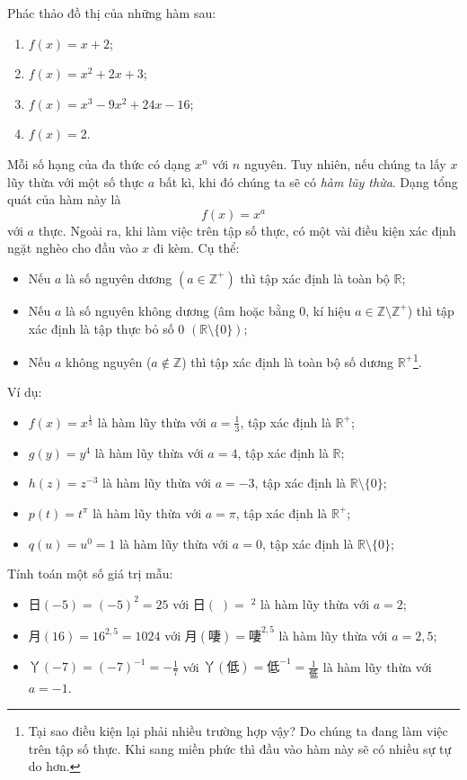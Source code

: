 \documentclass[a4paper, titlepage, openany]{book}
\newcounter{exercise}
\newcounter{solution}
\begin{document}
\exercise Phác thảo đồ thị của những hàm sau:
\begin{multicols}{2}
\begin{enumerate}
   \item $f(x) = x + 2$; 
   \item $f(x) = x^2 + 2x + 3$;
   \item $f(x) = x^3 - 9x^2 + 24x - 16$;
   \item $f(x) = 2$.
\end{enumerate}
\end{multicols}

\solution

Mỗi số hạng của đa thức có dạng $x^n$ với $n$ nguyên. Tuy nhiên, nếu chúng ta lấy $x$ lũy thừa với một số thực $a$ bất kì, khi đó chúng ta sẽ có \emph{hàm lũy thừa}. Dạng tổng quát của hàm này là $$f(x) = x^a$$ với $a$ thực. Ngoài ra, khi làm việc trên tập số thực, có một vài điều kiện xác định ngặt nghèo cho đầu vào $x$ đi kèm. Cụ thể:
\begin{itemize}
   \item Nếu $a$ là số nguyên dương $\left(a \in \mathbb{Z}^+\right)$ thì tập xác định là toàn bộ $\mathbb{R}$;
   \item Nếu $a$ là số nguyên không dương (âm hoặc bằng $0$, kí hiệu $a \in \mathbb{Z} \setminus\mathbb{Z}^+$) thì tập xác định là tập thực bỏ số $0$ $\left(\mathbb{R} \setminus \{0\}\right)$;
   \item Nếu $a$ không nguyên ($a \notin \mathbb{Z}$) thì tập xác định là toàn bộ số dương $\mathbb{R}^+$\footnote{Tại sao điều kiện lại phải nhiều trường hợp vậy? Do chúng ta đang làm việc trên tập số thực. Khi sang miền phức thì đầu vào hàm này sẽ có nhiều sự tự do hơn.}.
\end{itemize}
Ví dụ:
\begin{itemize}
   \item $f(x) = x^{\frac{1}{3}}$ là hàm lũy thừa với $a = \frac{1}{3}$, tập xác định là $\mathbb{R}^+$;
   \item $g(y) = y^{4}$ là hàm lũy thừa với $a = 4$, tập xác định là $\mathbb{R}$;
   \item $h(z) = z^{-3}$ là hàm lũy thừa với $a = -3$, tập xác định là $\mathbb{R} \setminus \{0\}$;
   \item $p(t) = t^{\pi}$ là hàm lũy thừa với $a = \pi$, tập xác định là $\mathbb{R}^+$;
   \item $q(u) = u^0 = 1$ là hàm lũy thừa với $a = 0$, tập xác định là $\mathbb{R} \setminus \{0\}$;
\end{itemize}
Tính toán một số giá trị mẫu:
\begin{itemize}
   \item $\textit{日}(-5) = (-5)^2 = 25$ với $\textit{日}\left(\textit{𠶎}\right) = \textit{𠶎}^2$ là hàm lũy thừa với $a = 2$;
   \item $\textit{月}(16) = 16^{2,5} = 1024$ với $\textit{月}\left(\textit{啛}\right) = \textit{啛}^{2,5}$ là hàm lũy thừa với $a = 2,5$;
   \item $\textit{丫}(-7) = (-7)^{-1} = -\frac{1}{7}$ với $\textit{丫}\left(\textit{低}\right) = \textit{低}^{-1} = \frac{1}{\textit{低}}$ là hàm lũy thừa với $a = -1$.
\end{itemize}
\end{document}
